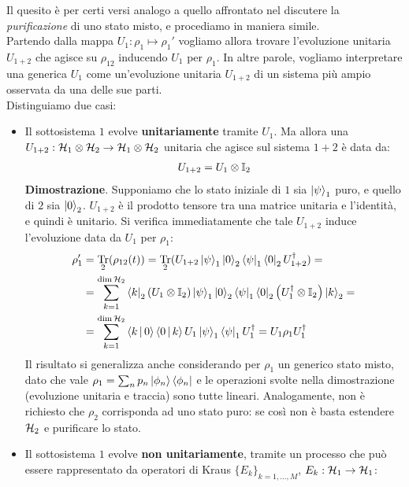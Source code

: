\documentclass[../../InformazioneQuantistica.tex]{subfiles}
\begin{document}
\begin{figure}[H]
    \centering
    
\end{figure}

Il quesito è per certi versi analogo a quello affrontato nel discutere la \textit{purificazione} di uno stato misto, e procediamo in maniera simile.\\
Partendo dalla mappa $U_1:\rho_1\mapsto \rho_1'$ vogliamo allora trovare l'evoluzione unitaria $U_{1+2}$ che agisce su $\rho_{12}$ inducendo $U_1$ per $\rho_1$. In altre parole, vogliamo interpretare una generica  $U_1$ come un'evoluzione unitaria $U_{1+2}$ di un sistema più ampio osservata da una delle sue parti.\\

Distinguiamo due casi:
\begin{itemize}
\item Il sottosistema $1$ evolve \textbf{unitariamente} tramite $U_1$. Ma allora una $U_{1+2}: \mathcal{H}_1 \otimes \mathcal{H}_2 \to \mathcal{H}_1 \otimes \mathcal{H}_2$ unitaria che agisce sul sistema $1+2$ è  data da:
\begin{align*}
U_{1+2} = U_1 \otimes \mathbb{I}_2
\end{align*}
\textbf{Dimostrazione}.
Supponiamo che lo stato iniziale di $1$ sia $\Ket{\psi}_1$ puro, e quello di $2$ sia $\Ket{0}_2$. $U_{1+2}$ è il prodotto tensore tra una matrice unitaria e l'identità, e quindi è unitario. Si verifica immediatamente che tale $U_{1+2}$ induce l'evoluzione data da $U_1$ per $\rho_1$:
\begin{align*}
\rho_1' &= \underset{2}{\operatorname{Tr}}(\rho_{12}(t)) = \underset{2}{\operatorname{Tr}}(U_{1+2}\Ket{\psi}_1\Ket{0}_{2}\Bra{\psi}_1\Bra{0}_{2}U_{1+2}^\dag)=\\
&= \sum_{k=1}^{\operatorname{dim}\mathcal{H}_2} \Bra{k}_2 \left(U_1 \otimes \mathbb{I}_2\right)\Ket{\psi}_1\Ket{0}_{2}\Bra{\psi}_1\Bra{0}_{2}\left(U_1^\dag \otimes \mathbb{I}_2\right)\Ket{k}_2 =\\
&=\sum_{k=1}^{\operatorname{dim}\mathcal{H}_2} \Braket{k|0}\Braket{0|k} U_1 \Ket{\psi}_1 \Bra{\psi}_1 U_1^\dag =U_1 \rho_1 U_1^\dag
\end{align*}
Il risultato si generalizza anche considerando per $\rho_1$ un generico stato misto, dato che vale $\rho_1 = \sum_n p_n\Ket{\phi_n}\Bra{\phi_n}$ e le operazioni svolte nella dimostrazione (evoluzione unitaria e traccia) sono tutte lineari. Analogamente, non è richiesto che $\rho_2$ corrisponda ad uno stato puro: se così non è basta estendere $\mathcal{H}_2$ e purificare lo stato.
\item Il sottosistema $1$ evolve \textbf{non unitariamente}, tramite un processo che può essere rappresentato da operatori di Kraus $\{E_k\}_{k=1,\dots,M}$, $E_k:\mathcal{H}_1 \to \mathcal{H}_1$:

\end{itemize}
\end{document}
